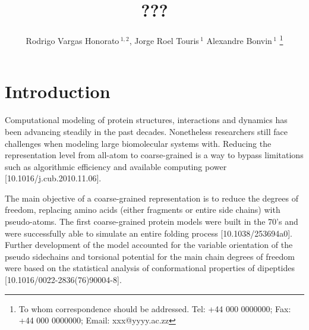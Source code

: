 \documentclass[a4,center,fleqn]{NAR}
\begin{document}
\title{???}

\author{%
Rodrigo Vargas Honorato\,$^{1,2}$,
Jorge Roel Touris\,$^{1}$
Alexandre Bonvin\,$^1$%
\footnote{To whom correspondence should be addressed.
Tel: +44 000 0000000; Fax: +44 000 0000000; Email: xxx@yyyy.ac.zz}}

\address{%
$^{1}$Bijvoet Center for Biomolecular Research, Faculty of Science, Utrecht University, Utrecht 3584CH, the Netherlands
$^{2}$Brazilian Biosciences National Laboratory (LNBio), Brazilian Center for Research in Energy and Materials (CNPEM), Zip Code 13083-970, Campinas, Sao Paulo, Brazil.}


\maketitle

\begin{abstract}
\lipsum[1-1]

\end{abstract}


\section{Introduction}

Computational modeling of protein structures, interactions and dynamics has been advancing steadily in the past decades. Nonetheless researchers still face challenges when modeling large biomolecular systems with. Reducing the representation level from all-atom to coarse-grained is a way to bypass limitations such as algorithmic efficiency and available computing power [10.1016/j.cub.2010.11.06].

The main objective of a coarse-grained representation is to reduce the degrees of freedom, replacing amino acids (either fragments or entire side chains) with pseudo-atoms. The first coarse-grained protein models were built in the 70's and were successfully able to simulate an entire folding process [10.1038/253694a0]. Further development of the model accounted for the variable orientation of the pseudo sidechains and torsional potential for the main chain degrees of freedom were based on the statistical analysis of conformational properties of dipeptides [10.1016/0022-2836(76)90004-8]. 
\end{document}
